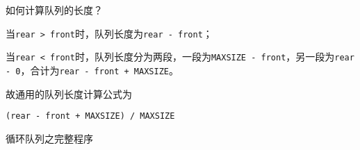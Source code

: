 \begin{frame}[fragile]\ft{\subsecname}
\begin{wenti}
如何计算队列的长度？
\end{wenti}
\vspace{0.1in}\pause 

当{\tt rear > front}时，队列长度为{\tt rear - front}；  \vspace{0.1in}\pause

当{\tt rear < front}时，队列长度分为两段，一段为{\tt MAXSIZE - front}，另一段为{\tt rear - 0}，合计为{\tt rear - front + MAXSIZE}。  \vspace{0.1in}\pause

故通用的队列长度计算公式为

{\tt  (rear - front + MAXSIZE) / MAXSIZE}
\end{frame}


\begin{frame}\ft{\subsecname}

\textcolor{acolor5}{\Large 循环队列之完整程序}

\end{frame}


\begin{frame}

\end{frame}


\begin{frame}

\end{frame}

\begin{frame}

\end{frame}

\begin{frame}

\end{frame}

\begin{frame}

\end{frame}
